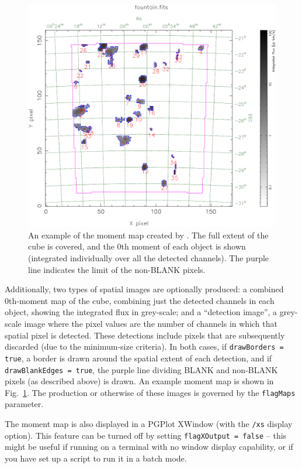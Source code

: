 \begin{figure}[!t]
  \begin{center}
    \includegraphics[width=\textwidth]{example_moment_map}
  \end{center}
  \caption{\footnotesize An example of the moment map created by
    \duchamp. The full extent of the cube is covered, and the 0th moment
    of each object is shown (integrated individually over all the
    detected channels). The purple line indicates the limit of the
    non-BLANK pixels.}
  \label{fig-moment}
\end{figure}

Additionally, two types of spatial images are optionally produced: a
combined 0th-moment map of the cube, combining just the detected
channels in each object, showing the integrated flux in grey-scale;
and a ``detection image'', a grey-scale image where the pixel values
are the number of channels in which that spatial pixel is
detected. These detections include pixels that are subsequently
discarded (due to the minimum-size criteria). In both cases, if
\texttt{drawBorders = true}, a border is drawn around the spatial
extent of each detection, and if \texttt{drawBlankEdges = true}, the
purple line dividing BLANK and non-BLANK pixels (as described above)
is drawn. An example moment map is shown in Fig.~\ref{fig-moment}.
The production or otherwise of these images is governed by the
\texttt{flagMaps} parameter.

The moment map is also displayed in a PGPlot XWindow (with the
\texttt{/xs} display option). This feature can be turned off by
setting \texttt{flagXOutput = false} -- this might be useful if
running \duchamp on a terminal with no window display capability, or
if you have set up a script to run it in a batch mode.

